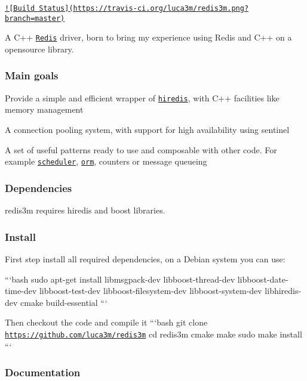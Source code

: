 \href{https://travis-ci.org/luca3m/redis3m}{\tt !\mbox{[}Build Status\mbox{]}(https\-://travis-\/ci.\-org/luca3m/redis3m.\-png?branch=master)}

A C++ \href{http://redis.io}{\tt Redis} driver, born to bring my experience using Redis and C++ on a opensource library.

\subsubsection*{Main goals}


\begin{DoxyEnumerate}
\item Provide a simple and efficient wrapper of \href{http://github.com/redis/hiredis}{\tt hiredis}, with C++ facilities like memory management
\item A connection pooling system, with support for high availability using sentinel
\item A set of useful patterns ready to use and composable with other code. For example \href{http://luca3m.me/2013/12/03/redis-scheduler.html}{\tt scheduler}, \href{http://github.com/soveran/ohm}{\tt orm}, counters or message queueing
\end{DoxyEnumerate}

\subsubsection*{Dependencies}

redis3m requires hiredis and boost libraries.

\subsubsection*{Install}

First step install all required dependencies, on a Debian system you can use\-:

```bash sudo apt-\/get install libmsgpack-\/dev libboost-\/thread-\/dev libboost-\/date-\/time-\/dev libboost-\/test-\/dev libboost-\/filesystem-\/dev libboost-\/system-\/dev libhiredis-\/dev cmake build-\/essential ```

Then checkout the code and compile it ```bash git clone \href{https://github.com/luca3m/redis3m}{\tt https\-://github.\-com/luca3m/redis3m} cd redis3m cmake make sudo make install ```

\subsubsection*{Documentation}

